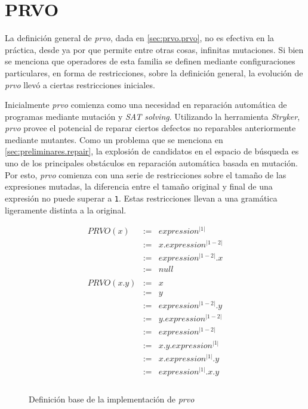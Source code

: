 \section{PRVO}

La definici\'on general de \emph{prvo}, dada en \ref{sec:prvo.prvo}, no es efectiva en la pr\'actica, desde ya por que permite entre otras cosas, infinitas mutaciones. Si bien se menciona que operadores de esta familia se definen mediante configuraciones particulares, en forma de restricciones, sobre la definici\'on general, la evoluci\'on de \emph{prvo} llev\'o a ciertas restricciones iniciales.

Inicialmente \emph{prvo} comienza como una necesidad en reparaci\'on autom\'atica de programas mediante mutaci\'on y \emph{SAT solving}. Utilizando la herramienta \emph{Stryker}, \emph{prvo} provee el potencial de reparar ciertos defectos no reparables anteriormente mediante mutantes. Como un problema que se menciona en \ref{sec:preliminares.repair}, la explosi\'on de candidatos en el espacio de b\'usqueda es uno de los principales obst\'aculos en reparaci\'on autom\'atica basada en mutaci\'on. Por esto, \emph{prvo} comienza con una serie de restricciones sobre el tama\~no de las expresiones mutadas, la diferencia entre el tama\~no original y final de una expresi\'on no puede superar a \texttt{1}. Estas restricciones llevan a una gram\'atica ligeramente distinta a la original.

\begin{figure}
	\begin{displaymath}
	\begin{array}{lll}
	PRVO(x)		& :=	& expression^{|1|} \\
	& := & x.expression^{|1-2|} \\
	& := & expression^{|1-2|}.x \\
	& := & null \\
	
	\\
	PRVO(x.y)	& :=	& x \\
	& :=	& 	y \\
	& :=	& expression^{|1-2|}.y \\
	& :=	& y.expression^{|1-2|} \\
	& :=	& expression^{|1-2|} \\
	& :=	& x.y.expression^{|1|} \\
	& :=	& x.expression^{|1|}.y \\
	& :=	& expression^{|1|}.x.y \\
	\\
	
	\end{array}
	\end{displaymath}
	\caption{Definici\'on base de la implementaci\'on de \emph{prvo}}
	\label{figures.definitions.prvo.impl_def}
\end{figure}

